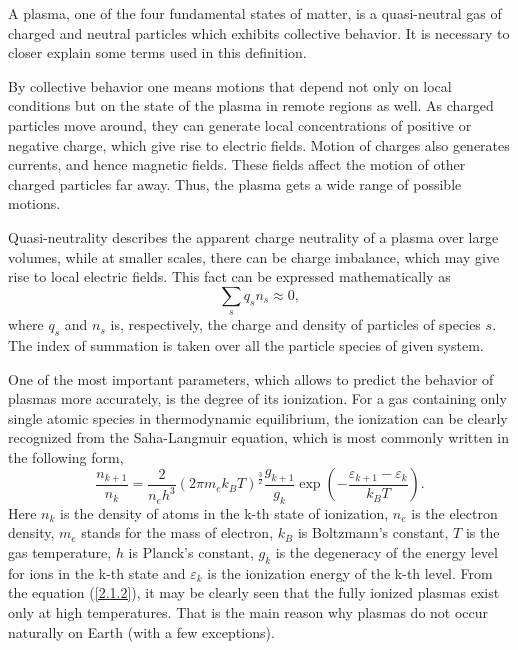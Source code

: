 A plasma, one of the four fundamental states of matter, is a quasi-neutral gas of charged and neutral particles which exhibits collective behavior. It is necessary to closer explain some terms used in this definition.

By collective behavior one means motions that depend not only on local conditions but on the state of the plasma in remote regions as well. As charged particles move around, they can generate local concentrations of positive or negative charge, which give rise to electric fields. Motion of charges also generates currents, and hence magnetic fields. These fields affect the motion of other charged particles far away. Thus, the plasma gets a wide range of possible motions.

Quasi-neutrality describes the apparent charge neutrality of a plasma over large volumes, while at smaller scales, there can be charge imbalance, which may give rise to local electric fields. This fact can be expressed mathematically as
\begin{equation}
\label{2.1.1}
\sum_{s} q_s n_s \approx 0,
\end{equation}
where $ q_s $ and $ n_s $ is, respectively, the charge and density of particles of species $ s $. The index of summation is taken over all the particle species of given system.

One of the most important parameters, which allows to predict the behavior of plasmas more accurately, is the degree of its ionization. For a gas containing only single atomic species in thermodynamic equilibrium, the ionization can be clearly recognized from the Saha-Langmuir equation, which is most commonly written in the following form,
\begin{equation}
\label{2.1.2}
\frac{n_{k+1}}{n_k} = \frac{2}{n_e h^3}\left(2\pi m_e k_B T\right)^{\frac{3}{2}} \frac{g_{k+1}}{g_k} \exp\left(-\frac{\varepsilon_{k+1} - \varepsilon_{k}}{k_{B} T} \right).
\end{equation}
Here $ n_k $ is the density of atoms in the k-th state of ionization, $ n_e $ is the electron density, $ m_e $ stands for the mass of electron, $ k_B $ is Boltzmann's constant, $ T $ is the gas temperature, $ h $ is Planck's constant, $ g_k $ is the degeneracy of the energy level for ions in the k-th state and $ \varepsilon_k $ is the ionization energy of the k-th level. From the equation (\ref{2.1.2}), it may be clearly seen that the fully ionized plasmas exist only at high temperatures. That is the main reason why plasmas do not occur naturally on Earth (with a few exceptions).

